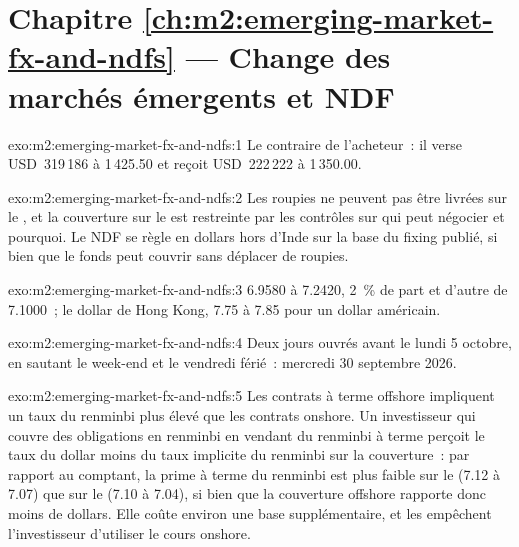 \section*{Chapitre \ref{ch:m2:emerging-market-fx-and-ndfs} --- Change des marchés émergents et NDF}

\begin{solution}{exo:m2:emerging-market-fx-and-ndfs:1}
Le contraire de l'acheteur~: il verse USD~319\,186 à 1\,425.50 et reçoit
USD~222\,222 à 1\,350.00.
\end{solution}

\begin{solution}{exo:m2:emerging-market-fx-and-ndfs:2}
Les roupies ne peuvent pas être livrées sur le , et la couverture sur le  est restreinte par les
contrôles sur qui peut négocier et pourquoi. Le NDF se règle en dollars hors d'Inde
sur la base du fixing publié, si bien que le fonds peut couvrir sans déplacer de roupies.
\end{solution}

\begin{solution}{exo:m2:emerging-market-fx-and-ndfs:3}
6.9580 à 7.2420, 2~\% de part et d'autre de 7.1000~; le dollar de Hong Kong, 7.75 à 7.85
pour un dollar américain.
\end{solution}

\begin{solution}{exo:m2:emerging-market-fx-and-ndfs:4}
Deux jours ouvrés avant le lundi 5 octobre, en sautant le week-end et le vendredi
férié~: mercredi 30 septembre 2026.
\end{solution}

\begin{solution}{exo:m2:emerging-market-fx-and-ndfs:5}
Les contrats à terme offshore impliquent un taux du renminbi plus élevé que les contrats onshore. Un investisseur
qui couvre des obligations en renminbi en vendant du renminbi à terme perçoit le taux du dollar moins
du taux implicite du renminbi sur la couverture~: par rapport au comptant, la prime à terme
du renminbi est plus faible sur le  (7.12 à 7.07) que sur le  (7.10 à 7.04), si bien que
la couverture offshore rapporte donc moins de dollars. Elle coûte environ une base supplémentaire, et les 
empêchent l'investisseur d'utiliser le cours onshore.
\end{solution}

